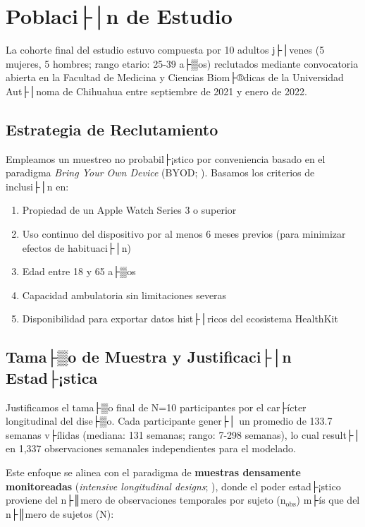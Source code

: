 \section{Poblaci├│n de Estudio}
\label{sec:poblacion_estudio}

La cohorte final del estudio estuvo compuesta por 10 adultos j├│venes (5 mujeres, 5 hombres; rango etario: 25-39 a├▒os) reclutados mediante convocatoria abierta en la Facultad de Medicina y Ciencias Biom├®dicas de la Universidad Aut├│noma de Chihuahua entre septiembre de 2021 y enero de 2022.

\subsection{Estrategia de Reclutamiento}
\label{subsec:reclutamiento}

Empleamos un muestreo no probabil├¡stico por conveniencia basado en el paradigma \textit{Bring Your Own Device} (BYOD; \cite{Doherty2021}). Basamos los criterios de inclusi├│n en:

\begin{enumerate}
    \item Propiedad de un Apple Watch Series 3 o superior
    \item Uso continuo del dispositivo por al menos 6 meses previos (para minimizar efectos de habituaci├│n)
    \item Edad entre 18 y 65 a├▒os
    \item Capacidad ambulatoria sin limitaciones severas
    \item Disponibilidad para exportar datos hist├│ricos del ecosistema HealthKit
\end{enumerate}

\subsection{Tama├▒o de Muestra y Justificaci├│n Estad├¡stica}
\label{subsec:justificacion_n}

Justificamos el tama├▒o final de N=10 participantes por el car├ícter longitudinal del dise├▒o. Cada participante gener├│ un promedio de 133.7 semanas v├ílidas (mediana: 131 semanas; rango: 7-298 semanas), lo cual result├│ en 1,337 observaciones semanales independientes para el modelado.

Este enfoque se alinea con el paradigma de \textbf{muestras densamente monitoreadas} (\textit{intensive longitudinal designs}; \cite{Bolger2013}), donde el poder estad├¡stico proviene del n├║mero de observaciones temporales por sujeto (n$_{\text{obs}}$) m├ís que del n├║mero de sujetos (N):

